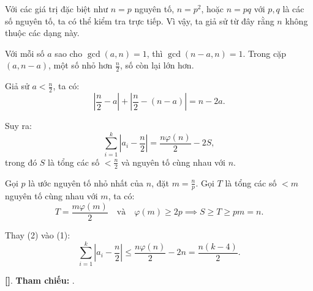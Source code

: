 \documentclass[../2015-n-s.tex]{subfiles}
\begin{document}
\begin{soln}

	Với các giá trị đặc biệt như \( n = p \) nguyên tố, \( n = p^2 \), hoặc \( n = pq \) với \( p, q \) là các số nguyên tố, ta có thể kiểm tra trực tiếp.
	Vì vậy, ta giả sử từ đây rằng \( n \) không thuộc các dạng này.

	Với mỗi số \( a \) sao cho \( \gcd(a, n) = 1 \), thì \( \gcd(n - a, n) = 1 \). Trong cặp \( (a, n - a) \), một số nhỏ hơn \( \frac{n}{2} \), số còn lại lớn hơn.

	Giả sử \( a < \frac{n}{2} \), ta có:
	\[
		\left| \frac{n}{2} - a \right| + \left| \frac{n}{2} - (n - a) \right| = n - 2a.
	\]

	Suy ra:
	\[
		\sum_{i=1}^k \left| a_i - \frac{n}{2} \right| = \frac{n\varphi(n)}{2} - 2S, \tag{1}
	\]
	trong đó \( S \) là tổng các số \( < \frac{n}{2} \) và nguyên tố cùng nhau với \( n \).

	Gọi \( p \) là ước nguyên tố nhỏ nhất của \( n \), đặt \( m = \frac{n}{p} \). Gọi \( T \) là tổng các số \( < m \) nguyên tố cùng nhau với \( m \), ta có:
	\[
		T = \frac{m\varphi(m)}{2} \quad \text{và} \quad \varphi(m) \ge 2p \implies S \ge T \ge pm = n. \tag{2}
	\]

	Thay (2) vào (1):
	\[
		\sum_{i=1}^k \left| a_i - \frac{n}{2} \right| \le \frac{n\varphi(n)}{2} - 2n = \frac{n(k - 4)}{2}.
	\]

	\vspace{1em}
	\textbf{[]}.
	\textbf{Tham chiếu:}  .
\end{soln}


\newpage
\end{document}
